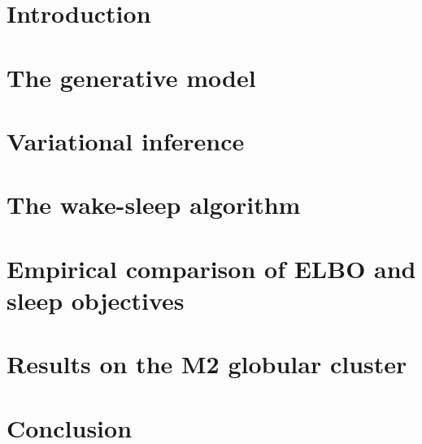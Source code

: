 \documentclass[12pt]{article}
\begin{document}


\section{Introduction}
\label{sec:intro}


\section{The generative model}
\label{sec:gen_model}


\section{Variational inference}
\label{sec:var_inference}


\section{The wake-sleep algorithm}
\label{sec:wake_sleep}




\section{Empirical comparison of ELBO and sleep objectives}


\section{Results on the M2 globular cluster}


\section{Conclusion}
\label{sec:discussion}



% 



\appendix

\renewcommand\thefigure{A.\arabic{figure}}
\renewcommand\thetable{A.\arabic{table}}
\setcounter{figure}{0}    
\setcounter{table}{0}    
\end{document}

